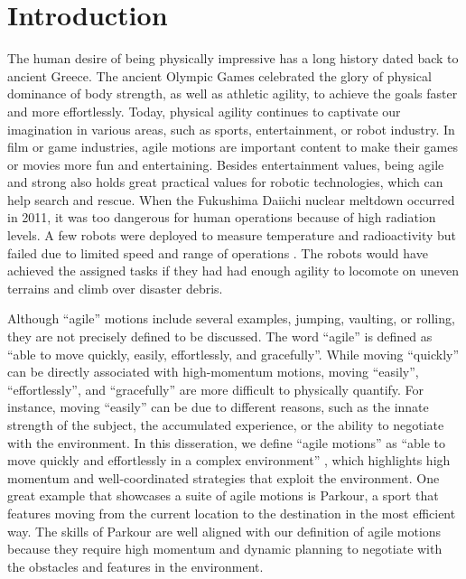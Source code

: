 \chapter{Introduction}

The human desire of being physically impressive has a long history
dated back to ancient Greece.
The ancient Olympic Games celebrated the glory of physical dominance of
body strength, as well as athletic agility, to achieve the goals
faster and more effortlessly. 
Today, physical agility continues to captivate our imagination in
various areas, such as sports, entertainment, or robot industry.
In film or game industries, agile motions are important content to make
their games or movies more fun and entertaining.
Besides entertainment values, being agile and strong also holds great practical
values for robotic technologies,
which can help search and rescue.
When the Fukushima Daiichi nuclear meltdown occurred in 2011,
it was too dangerous for human operations because of high radiation levels.
A few robots were deployed to
measure temperature and radioactivity but failed due to limited speed and range
of operations \cite{Fukushima:2014:URL}.
The robots would have achieved the assigned tasks if they had had
enough agility
to locomote on uneven terrains and climb over disaster debris.

Although ``agile'' motions include several examples, jumping,
vaulting, or rolling, they are not precisely defined to be discussed.
The word ``agile'' is defined as 
``able to move quickly, easily, effortlessly, and gracefully''.
While moving ``quickly'' can be directly associated with high-momentum
motions, moving ``easily'', ``effortlessly'', and ``gracefully'' are more
difficult to physically quantify.
For instance, moving ``easily'' can be due to different reasons, such as the
innate strength of the subject, the accumulated 
experience, or the ability to negotiate with the environment.
In this disseration, we define ``agile motions'' as 
``able to move quickly and effortlessly in a complex environment''
, which highlights high momentum
and well-coordinated strategies that exploit the environment.
One great example that showcases a suite of agile motions is Parkour,
a sport that features moving from the current location to the destination in
the most efficient way.
The skills of Parkour are well aligned with our definition of agile motions
because they require high momentum and dynamic planning to negotiate with the
obstacles and features in the environment.

